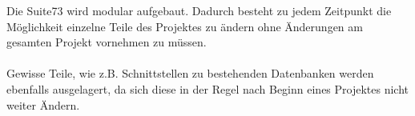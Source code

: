 Die Suite73 wird modular aufgebaut. Dadurch besteht zu jedem Zeitpunkt die Möglichkeit einzelne Teile des Projektes zu ändern ohne Änderungen am gesamten Projekt vornehmen zu müssen.\\
\\
Gewisse Teile, wie z.B. Schnittstellen zu bestehenden Datenbanken werden ebenfalls ausgelagert, da sich diese in der Regel nach Beginn eines Projektes nicht weiter Ändern.